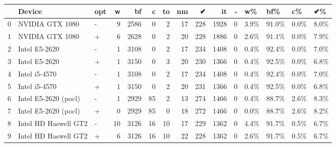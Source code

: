 \begin{tabular}{lllrrrrrrrrllll}
\toprule
{} &                Device & opt &   w &    bf &   c &  to &  nm &    ✔ &    it &  - &    w\% &    bf\% &    c\% &    ✔\% \\
\midrule
0 &       NVIDIA GTX 1080 &   - &   9 &  2586 &   0 &   2 &  17 &  228 &  1928 &  0 &  3.9\% &  91.0\% &  0.0\% &  8.0\% \\
1 &       NVIDIA GTX 1080 &   + &   6 &  2628 &   0 &   2 &  20 &  228 &  1886 &  0 &  2.6\% &  91.1\% &  0.0\% &  7.9\% \\
2 &         Intel E5-2620 &   - &   1 &  3108 &   0 &   2 &  17 &  234 &  1408 &  0 &  0.4\% &  92.4\% &  0.0\% &  7.0\% \\
3 &         Intel E5-2620 &   + &   1 &  3150 &   0 &   3 &  20 &  230 &  1366 &  0 &  0.4\% &  92.5\% &  0.0\% &  6.8\% \\
4 &         Intel i5-4570 &   - &   1 &  3108 &   0 &   2 &  17 &  234 &  1408 &  0 &  0.4\% &  92.4\% &  0.0\% &  7.0\% \\
5 &         Intel i5-4570 &   + &   1 &  3150 &   0 &   2 &  20 &  231 &  1366 &  0 &  0.4\% &  92.5\% &  0.0\% &  6.8\% \\
6 &  Intel E5-2620 (pocl) &   - &   1 &  2929 &  85 &   2 &  13 &  274 &  1466 &  0 &  0.4\% &  88.7\% &  2.6\% &  8.3\% \\
7 &  Intel E5-2620 (pocl) &   + &   0 &  2929 &  85 &   0 &  18 &  272 &  1466 &  0 &  0.0\% &  88.7\% &  2.6\% &  8.2\% \\
8 &  Intel HD Haswell GT2 &   - &  10 &  3126 &  16 &  10 &  17 &  229 &  1362 &  0 &  4.4\% &  91.7\% &  0.5\% &  6.7\% \\
9 &  Intel HD Haswell GT2 &   + &   6 &  3126 &  16 &  10 &  22 &  228 &  1362 &  0 &  2.6\% &  91.7\% &  0.5\% &  6.7\% \\
\bottomrule
\end{tabular}
